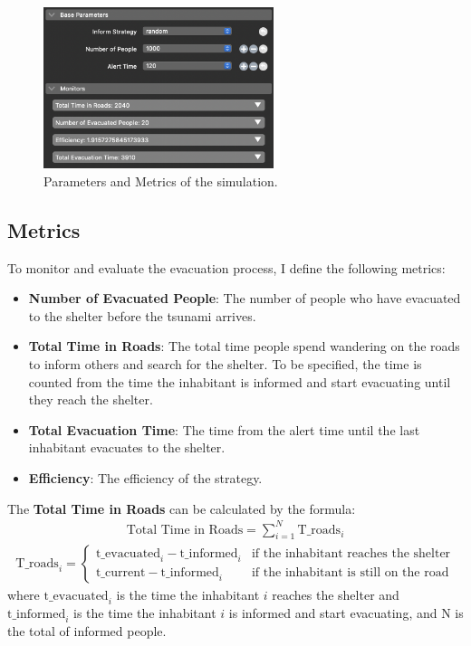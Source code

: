 \documentclass[12pt]{article}
\begin{document}
\begin{figure}
    \centering
    \includegraphics[width=0.6\textwidth]{../images/parameters.png}
    \caption{Parameters and Metrics of the simulation.}
    \label{fig:parameters}
\end{figure}


\subsection{Metrics}

To monitor and evaluate the evacuation process, I define the following metrics:
\begin{itemize}
    \item \textbf{Number of Evacuated People}: The number of people who have evacuated to the shelter before the tsunami arrives.
    \item \textbf{Total Time in Roads}: The total time people spend wandering on the roads to inform others and search for the shelter. To be specified, the time is counted from the time the inhabitant is informed and start evacuating until they reach the shelter.
    \item \textbf{Total Evacuation Time}: The time from the alert time until the last inhabitant evacuates to the shelter.
    \item \textbf{Efficiency}: The efficiency of the strategy.
\end{itemize}

The \textbf{Total Time in Roads} can be calculated by the formula:
\begin{align*}
    \text{Total Time in Roads} = \sum_{i=1}^{N} \text{T\_roads}_i
\end{align*}
\begin{align*}
    \text{T\_roads}_i = 
    \begin{cases}
        \text{t\_evacuated}_i - \text{t\_informed}_i & \text{if the inhabitant reaches the shelter} \\
        \text{t\_current} - \text{t\_informed}_i & \text{if the inhabitant is still on the road}
    \end{cases}
\end{align*}
where $\text{t\_evacuated}_i$ is the time the inhabitant $i$ reaches the shelter and $\text{t\_informed}_i$ is the time the inhabitant $i$ is informed and start evacuating, and N is the total of informed people. \\
\end{document}
